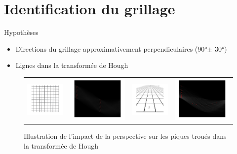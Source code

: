 \section{Identification du grillage}
\begin{frame}{Hypothèses}
\begin{itemize}
	\item Directions du grillage approximativement perpendiculaires (90°$\pm$ 30°)
	\item Lignes dans la transformée de Hough	
\end{itemize}
\begin{figure}[t]
\begin{center}
\begin{tabular}{cccc}
\includegraphics[width = 0.23 \columnwidth]{fig/grillagereduit.png} &
\includegraphics[width = 0.23 \columnwidth]{fig/grillagehough.png}
&
\includegraphics[width = 0.23 \columnwidth]{fig/perspectivereduit.png}
& \includegraphics[width = 0.23 \columnwidth]{fig/perspectivehough.png}
\end{tabular}
\caption{\label{houghlines} Illustration de l'impact de la perspective sur les piques troués dans la transformée de Hough}
\end{center}
\end{figure}
\end{frame}

